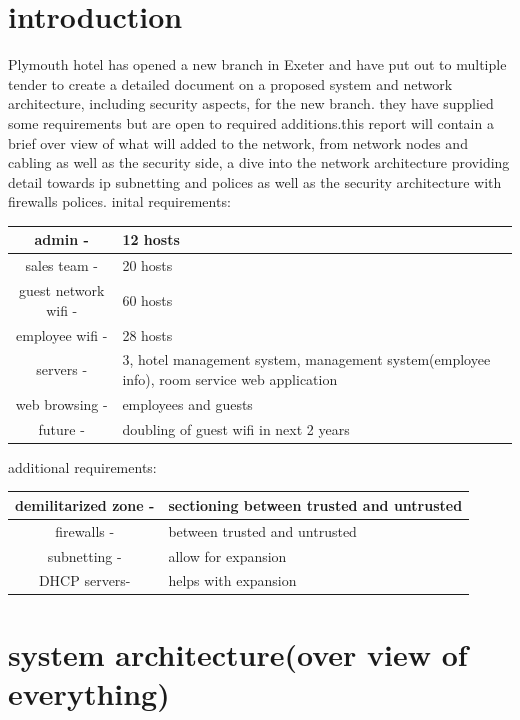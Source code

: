 \documentclass[11pt]{article}
\begin{document}
\section{introduction}
Plymouth hotel has opened a new branch in Exeter and have put out to multiple tender to create a detailed document on a proposed system and network architecture, including security aspects, for the new branch. they have supplied some requirements but are open to required additions.this report will contain a brief over view of what will added to the network, from network nodes and cabling as well as the security side, a dive into the network architecture providing detail towards ip subnetting and polices as well as the security architecture with firewalls polices.\newline
\newline
inital requirements:\newline
\begin{tabular}{||c|m{11cm}||}
\hline
	admin - &12 hosts\\
\hline
	sales team - &20 hosts\\
\hline
	guest network wifi - &60 hosts\\
\hline
	employee wifi - &28 hosts\\
\hline
	servers - & 3, hotel management system, management system(employee info), room service web application\\
\hline
	web browsing - &employees and guests\\
\hline
	future - &doubling of guest wifi in next 2 years\\
\hline
\end{tabular}\newline
\newline
additional requirements:\newline
\begin{tabular}{|c|m{11cm}|}
\hline
	demilitarized zone - &sectioning between trusted and untrusted\\
\hline
	firewalls - & between trusted and untrusted\\
\hline
	subnetting - & allow for expansion\\
\hline
	DHCP servers- & helps with expansion\\
\hline
\end{tabular}

\section{system architecture(over view of everything)}
\end{document}
